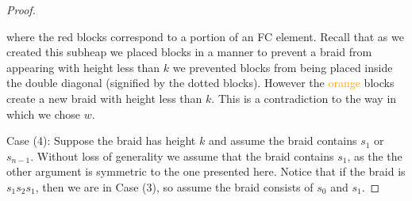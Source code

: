\begin{theorem}
\begin{proof}
\begin{center}
	\end{center}
	where the \textcolor{rred}{red} blocks correspond to a portion of an FC element. Recall that as we created this subheap we placed blocks in a manner to prevent a braid from appearing with height less than $k$ we prevented blocks from being placed inside the double diagonal (signified by the dotted blocks). However the \textcolor{orange}{orange} blocks create a new braid with height less than $k$. This is a contradiction to the way in which we chose $w$.  
%		
%		
%	
%		
		
	Case (4): Suppose the braid has height $k$ and assume the braid contains $s_1$ or $s_{n-1}$. Without loss of generality we assume that the braid contains $s_1$, as the the other argument is symmetric to the one presented here. Notice that if the braid is  $s_1s_2s_1$, then we are in Case (3), so assume the braid consists of $s_0$ and $s_1$. 
	

\end{proof}
\end{theorem}
